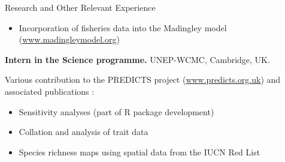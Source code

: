 \begin{rubric}{Research and Other Relevant Experience}
\begin{itemize}[topsep=0pt,itemsep=-1ex,partopsep=1ex,parsep=1ex]
	\item Incorporation of fisheries data into the Madingley model (\url{www.madingleymodel.org})
	\end{itemize}
\entry*[2013]%
	\textbf{Intern in the Science programme.} UNEP-WCMC, Cambridge, UK.
	\par Various contribution to the PREDICTS project (\url{www.predicts.org.uk}) and associated publications \parencite{newbold_global_2015, hudson_predicts_2014, hudson_database_2017}: 
	\begin{itemize}[topsep=0pt,itemsep=-1ex,partopsep=1ex,parsep=1ex]
	\item Sensitivity analyses (part of R package development)
	\item Collation and analysis of trait data
	\item Species richness maps using spatial data from the IUCN Red List
	\end{itemize}
%
\end{rubric}